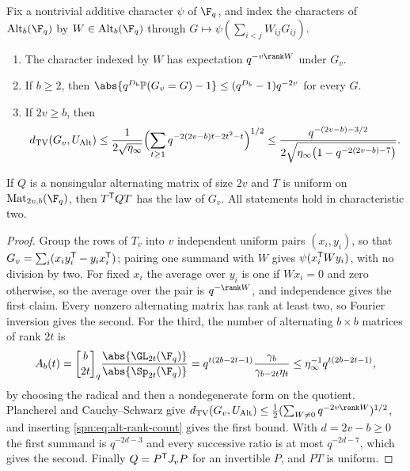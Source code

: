 \begin{lemma}\label{spn:lem:alt-gram}
Fix a nontrivial additive character $\psi$ of $\F_q$, and index the characters of
$\spnAlt_b(\F_q)$ by $W\in\spnAlt_b(\F_q)$ through $G\mapsto\psi(\sum_{i<j}W_{ij}G_{ij})$.
\begin{enumerate}
\item The character indexed by $W$ has expectation $q^{-v\rank W}$ under $G_v$.
\item If $b\ge2$, then $\abs{q^{D_b}\spnP(G_v=G)-1}\le(q^{D_b}-1)q^{-2v}$ for every $G$.
\item If $2v\ge b$, then
\[
 d_{\mathrm{TV}}(G_v,U_{\operatorname{Alt}})\le\frac{1}{2\sqrt{\eta_\infty}}
 \Bigl(\sum_{t\ge1}q^{-2(2v-b)t-2t^2-t}\Bigr)^{1/2}
 \le\frac{q^{-(2v-b)-3/2}}{2\sqrt{\eta_\infty\bigl(1-q^{-2(2v-b)-7}\bigr)}} .
\]
\end{enumerate}
If $Q$ is a nonsingular alternating matrix of size $2v$ and $T$ is uniform on
$\spnMat_{2v,b}(\F_q)$, then $T^{\mathsf{T}}QT$ has the law of $G_v$. All statements hold in
characteristic two.
\end{lemma}

\begin{proof}
Group the rows of $T_v$ into $v$ independent uniform pairs $(x_i,y_i)$, so that
$G_v=\sum_i(x_iy_i^{\mathsf{T}}-y_ix_i^{\mathsf{T}})$; pairing one summand with $W$ gives
$\psi(x_i^{\mathsf{T}}Wy_i)$, with no division by two. For fixed $x_i$ the average over $y_i$ is one
if $Wx_i=0$ and zero otherwise, so the average over the pair is $q^{-\rank W}$, and
independence gives the first claim. Every nonzero alternating matrix has rank at least two, so
Fourier inversion gives the second. For the third, the number of alternating $b\times b$
matrices of rank $2t$ is
\begin{equation}\label{spn:eq:alt-rank-count}
 A_b(t)=\spnqbin{b}{2t}{q}\frac{\abs{\GL_{2t}(\F_q)}}{\abs{\Sp_{2t}(\F_q)}}
 =q^{t(2b-2t-1)}\frac{\gamma_b}{\gamma_{b-2t}\eta_t}\le\eta_\infty^{-1}q^{t(2b-2t-1)},
\end{equation}
by choosing the radical and then a nondegenerate form on the quotient. Plancherel and
Cauchy--Schwarz give
$\spnTV(G_v,U_{\spnAlt})\le\frac12(\sum_{W\ne0}q^{-2v\rank W})^{1/2}$, and inserting
\eqref{spn:eq:alt-rank-count} gives the first bound. With $d=2v-b\ge0$ the first summand is
$q^{-2d-3}$ and every successive ratio is at most $q^{-2d-7}$, which gives the second. Finally
$Q=P^{\mathsf{T}}J_vP$ for an invertible $P$, and $PT$ is uniform.
\end{proof}

